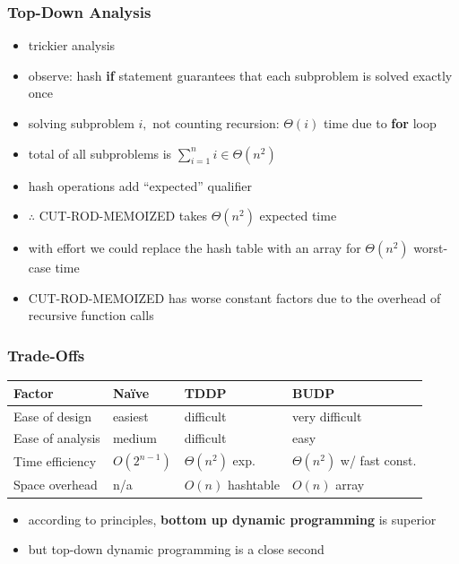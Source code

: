 \documentclass{beamer}
\newcommand{\Naive}{Na\"{i}ve~}
\begin{document}
\begin{frame} \frametitle{Top-Down Analysis}
    \begin{itemize}
      \item trickier analysis
      \item observe: hash \textbf{if} statement guarantees that each subproblem is solved exactly once
      \item solving subproblem $i,$ not counting recursion: $\Theta(i)$ time due to \textbf{for} loop
      \item total of all subproblems is $\sum_{i=1}^n i \in \Theta(n^2)$
      \item hash operations add ``expected'' qualifier
      \item $\therefore$ CUT-ROD-MEMOIZED takes $\Theta(n^2)$ expected time
      \item with effort we could replace the hash table with an array for $\Theta(n^2)$ worst-case time
      \item CUT-ROD-MEMOIZED has worse constant factors due to the overhead of recursive function calls
    \end{itemize}
\end{frame}

\begin{frame} \frametitle{Trade-Offs}
\begin{center}
  \begin{tabular}{llll}
    \textbf{Factor} & \textbf{\Naive} & \textbf{TDDP} & \textbf{BUDP} \\ \hline
    Ease of design & easiest & difficult & very difficult \\
    Ease of analysis & medium & difficult & easy \\
    Time efficiency & $O(2^{n-1})$ & $\Theta(n^2)$ exp. & $\Theta(n^2)$ w/ fast const. \\
    Space overhead & n/a & $O(n)$ hashtable & $O(n)$ array \\
  \end{tabular}
\end{center}

\begin{itemize}
  \item according to principles, \textbf{bottom up dynamic programming} is superior
  \item but top-down dynamic programming is a close second
\end{itemize}
\end{frame}
\end{document}
